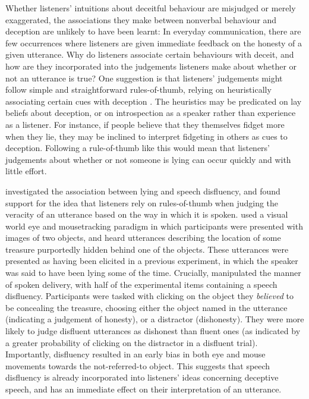 \documentclass[a4paper,man,natbib]{apa6}
\begin{document}
Whether listeners' intuitions about deceitful behaviour are misjudged or merely exaggerated, the associations they make between nonverbal behaviour and deception are unlikely to have been learnt: In everyday communication, there are few occurrences where listeners are given immediate feedback on the honesty of a given utterance.
Why do listeners associate certain behaviours with deceit, and how are they incorporated into the judgements listeners make about whether or not an utterance is true?
One suggestion is that listeners' judgements might follow simple and straightforward rules-of-thumb, relying on heuristically associating certain cues with deception \citep{DePaulo1982}.
The heuristics may be predicated on lay beliefs about deception, or on introspection as a speaker rather than experience as a listener.
For instance, if people believe that they themselves fidget more when they lie, they may be inclined to interpret fidgeting in others as cues to deception.
Following a rule-of-thumb like this would mean that listeners' judgements about whether or not someone is lying can occur quickly and with little effort.

\citet{Loy2017} investigated the association between lying and speech disfluency, and found support for the idea that listeners rely on rules-of-thumb when judging the veracity of an utterance based on the way in which it is spoken.
\citeauthor{Loy2017} used a visual world eye  and mousetracking paradigm in which participants were presented with images of two objects, and heard utterances describing the location of some treasure purportedly hidden behind one of the objects.
These utterances were presented as having been elicited in a previous experiment, in which the speaker was said to have been lying some of the time.
Crucially, \citet{Loy2017} manipulated the manner of spoken delivery, with half of the experimental items containing a speech disfluency.
Participants were tasked with clicking on the object they \textit{believed} to be concealing the treasure, choosing either the object named in the utterance (indicating a judgement of honesty), or a distractor (dishonesty).
They were more likely to judge disfluent utterances as dishonest than fluent ones (as indicated by a greater probability of clicking on the distractor in a disfluent trial). 
Importantly, disfluency resulted in an early bias in both eye and mouse movements towards the not-referred-to object.
This suggests that speech disfluency is already incorporated into listeners' ideas concerning deceptive speech, and has an immediate effect on their interpretation of an utterance. 
\end{document}

